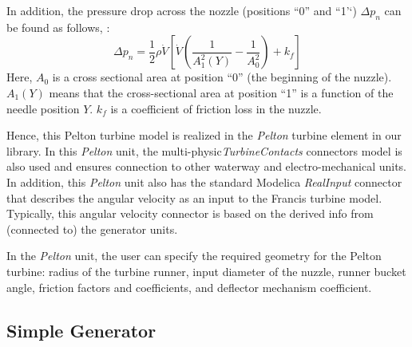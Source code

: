 \documentclass[%
]{USN-PhD}
\begin{document}
In addition, the pressure drop across the nozzle (positions ``0'' and ``1'`) $\Delta p_n$ can be found as follows, \cite{LieL:18}:
\begin{equation}
\Delta p_n=\frac{1}{2}\rho\dot{V}\left[\dot{V}\left(\frac{1}{A_1^2(Y)}-\frac{1}{A_0^2}\right)+k_f\right]
\end{equation}
Here, $A_0$ is a cross sectional area at position ``0'' (the beginning of the nuzzle). $A_1(Y)$ means that the cross-sectional area at position ``1'' is a function of the needle position $Y$. $k_f$ is a coefficient of friction loss in the nuzzle.

Hence, this Pelton turbine model is realized in the \emph{Pelton} turbine element in our library.  In this \emph{Pelton} unit, the multi-physic\emph{TurbineContacts} connectors model is also used and ensures connection to other waterway and electro-mechanical units. In addition, this \emph{Pelton} unit also has the standard Modelica \emph{RealInput} connector that describes the angular velocity as an input to the Francis turbine model. Typically, this angular velocity connector is based on the derived info from (connected to) the generator units.

In the \emph{Pelton} unit, the user can specify the required geometry for the Pelton turbine: radius of the turbine runner, input diameter of the nuzzle, runner bucket angle, friction factors and coefficients, and deflector mechanism coefficient.

\subsection{Simple Generator}
\end{document}

